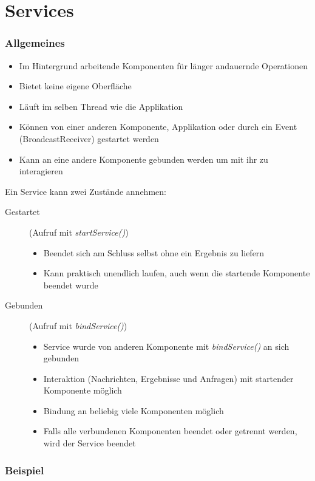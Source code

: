 \section{Services}
\begin{frame}[label=services]
   \frametitle{Allgemeines}
   \begin{itemize}
      \item Im Hintergrund arbeitende Komponenten für länger andauernde Operationen
      \item Bietet keine eigene Oberfläche
      \item Läuft im selben Thread wie die Applikation
      \item Können von einer anderen Komponente, Applikation oder durch ein 
         Event (BroadcastReceiver) gestartet werden
      \item Kann an eine andere Komponente gebunden werden um mit ihr zu interagieren
   \end{itemize}

   Ein Service kann zwei Zustände annehmen:

   \begin{description}
   \item[Gestartet] (Aufruf mit \emph{startService()})
      \begin{itemize}
         \item Beendet sich am Schluss selbst ohne ein Ergebnis zu liefern
         \item Kann praktisch unendlich laufen, auch wenn die startende 
            Komponente beendet wurde
      \end{itemize}  
   \item[Gebunden] (Aufruf mit \emph{bindService()})
      \begin{itemize}
         \item Service wurde von anderen Komponente mit \emph{bindService()} an sich gebunden 
         \item Interaktion (Nachrichten, Ergebnisse und Anfragen) mit startender Komponente möglich
         \item Bindung an beliebig viele Komponenten möglich
         \item Falls alle verbundenen Komponenten beendet oder getrennt werden, 
            wird der Service beendet
      \end{itemize}  
   \end{description}
\end{frame}

\begin{frame}[label=services]
   \frametitle{Beispiel}
   
\end{frame}

